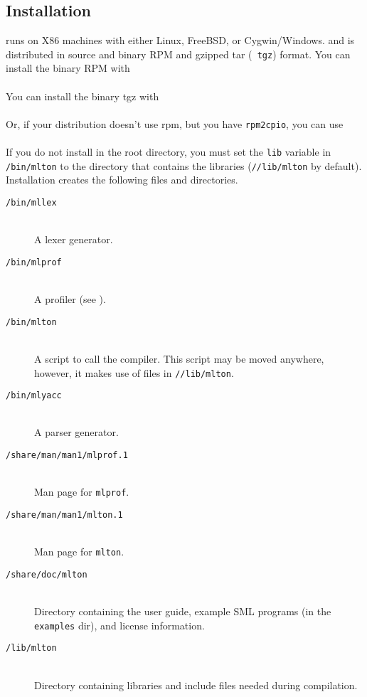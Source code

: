 
\subsection{Installation}

{\mlton} runs on X86 machines with either Linux, FreeBSD, or Cygwin/Windows.
and is distributed in source and binary RPM and gzipped tar ({\tt
tgz}) format.  You can install the binary RPM with\\
\hspace*{2em}{\tt rpm -i mlton-\version-1.i386.rpm}\\
You can install the binary tgz with\\
\hspace*{2em}{\tt zcat mlton-\version-1.i386-linux.tgz | tar x}\\
Or, if your distribution doesn't use rpm, but you have {\tt rpm2cpio},
you can use\\
\hspace*{2em}{\tt rpm2cpio mlton-\version-1.i386.rpm | cpio -id}\\
If you do not install {\mlton} in the root directory, you must
set the {\tt lib} variable in {\tt \prefix/bin/mlton} to the
directory that contains the libraries ({\tt /\prefix/lib/mlton} by
default).
Installation creates the following files and directories.

\newcommand{\place}[1]{\item[\tt #1]\hspace{1in}\\}

\begin{description}

\place{\prefix/bin/mllex}
A lexer generator.

\place{\prefix/bin/mlprof}
A profiler (see ).

\place{\prefix/bin/mlton}
A script to call the compiler.
This script may be moved anywhere, however,
it makes use of files in {\tt /\prefix/lib/mlton}.

\place{\prefix/bin/mlyacc}
A parser generator.

\place{\prefix/share/man/man1/mlprof.1}
Man page for {\tt mlprof}.

\place{\prefix/share/man/man1/mlton.1}
Man page for {\tt mlton}.

\place{\prefix/share/doc/mlton}

Directory containing the user guide, example SML programs (in the {\tt examples}
dir), and license information.

\place{\prefix/lib/mlton}
Directory containing libraries and include files needed during
compilation.

\end{description}

